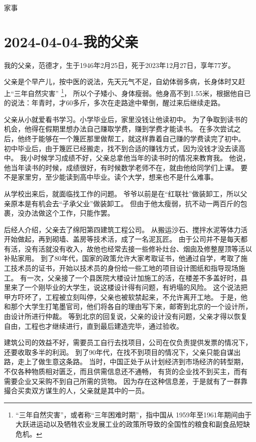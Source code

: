 \begin{taged}{家事}
  \section{2024-04-04-我的父亲}
\end{taged}

我的父亲，范德才，生于1946年2月25日，死于2023年12月27日，享年77岁。

父亲是个早产儿，按中医的说法，先天元气不足，自幼体弱多病，长身体时又赶上“三年自然灾害”
\footnote{“三年自然灾害”，或者称“三年困难时期”，指中国从 1959年至1961年期间由于大跃进运动以及牺牲农业发展工业的政策所导致的全国性的粮食和副食品短缺危机。}，
所以个子矮小、身体瘦弱。他身高不到1.55米，根据他自已的说法：年青时，才60多斤，多次在走路途中晕倒，醒过来后继续走路。

父亲从小就爱看书学习。小学毕业后，家里没钱让他读初中。
为了争取到读书的机会，他得在假期里想办法自己赚取学费，赚到学费才能读书。
在多次尝试之后，他终于能够在一个篾匠那里做帮工，就这样靠着自己赚的学费读完了初中。
初中毕业后，由于篾匠已经搬走，找不到合适的赚钱方式，因为没钱才没去读高中。
我小时候学习成绩不好，父亲总拿他当年的读书时的情况来教育我。
他说，他当年读书的时候，成绩很好，有时候数学老师不在，就由他给同学们上课。
要不是家里穷，至少能读到高中毕业。读个大学，想来也不是什么难事。

从学校出来后，就面临找工作的问题。
爷爷以前是在“红联社”做装卸工，所以父亲原本是有机会去“子承父业”做装卸工。
但由于他太瘦弱，抗不动一两百斤的包裹，没办法做这个工作，只能作罢。

后经人介绍，父亲去了绵阳第四建筑工程公司。
从搬运沙石、搅拌水泥等体力活开始做起，再到砌墙、盖房等技术活，成了一名泥瓦匠。
由于公司并不是每天都有活，没有活就没有收入，故他也经常去接一些修补灶台、烟囱及修整屋顶等活以补贴家用。
到了80年代，国家的政策允许大家考取证书，他通过自学，考取了施工技术员的证书，开始以技术员的身份给一些工地的项目设计图纸和指导现场施工。
有一次，父亲接了一个县医院大楼设计加施工的活，在楼差不多盖好时，县里来了一个刚毕业的大学生，说这楼设计得有问题，有坍塌的风险。
这个说法把甲方吓坏了，工程被立刻叫停，父亲也被软禁起来，不允许离开工地。
于是，他和那个大学生打笔墨官司，他们将各自的理由写下来，邮寄到北京的一个设计所，由设计所进行仲裁。
等到北京的回复说，父亲的设计没有问题，父亲才得以恢复自由，工程也才继续进行，直到最后建造完毕，通过验收。

建筑公司的效益不好，需要员工自行去找项目，公司在仅负责提供发票的情况下，还要收取多半的利润。
到了90年代，在找不到项目的情况下，父亲只能自谋出路，走上了做生意这条路。
当时，中国正处于从计划经济到市场经济的转型期，不仅各种物质相对匮乏，而且供需信息还不通畅，
有货的企业找不到买主，而有需要企业又采购不到自己所需的货物。
因为存在这种信息差，于是就有了一群靠撮合买卖双方谋生的人，父亲就是其中的一员。

